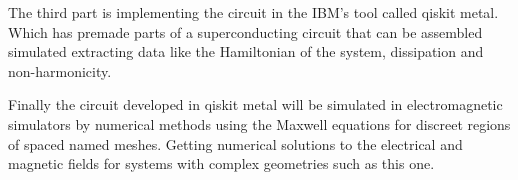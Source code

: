 \documentclass[12pt]{article}
\numberwithin{equation}{subsection}
\begin{document}
The third part is implementing the circuit in the IBM's tool called qiskit metal. Which has premade parts of a superconducting circuit that can be assembled simulated extracting data like the Hamiltonian of the system, dissipation and non-harmonicity.

Finally the circuit developed in qiskit metal will be simulated in electromagnetic simulators by numerical methods using the Maxwell equations for discreet regions of spaced named meshes. Getting numerical solutions to the electrical and magnetic fields for systems with complex geometries such as this one.


\printbibliography
\end{document}
